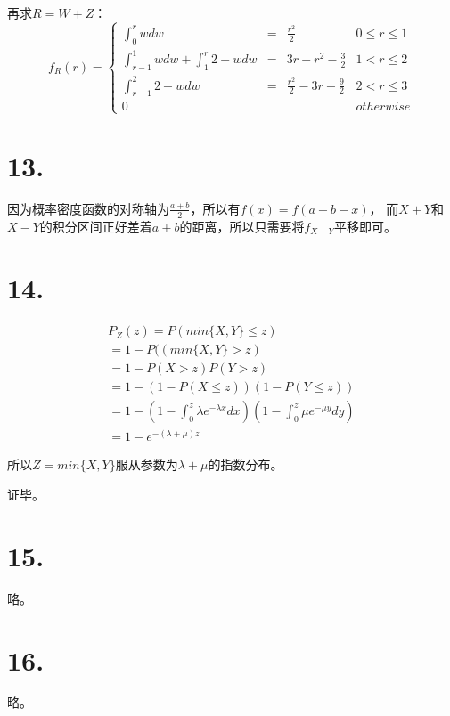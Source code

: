 \documentclass[UTF8]{report}
\begin{document}
        再求$R = W + Z$：
        $$f_R(r) = \left\{
            \begin{array}{llccr}
                \int_{0}^{r}wdw & = & \frac{r^2}{2} & 0 \leq r \leq 1\\
                \int_{r - 1}^{1}wdw + \int_{1}^{r}2-wdw & = & 3r - r^2 - \frac{3}{2} & 1 < r \leq 2\\
                \int_{r - 1}^{2}2 - wdw & = & \frac{r^2}{2} - 3r + \frac{9}{2} & 2 < r \leq 3\\
                0 & & & otherwise
            \end{array}
        \right.$$
    \section*{13.}
        因为概率密度函数的对称轴为$\frac{a + b}{2}$，所以有$f(x) = f(a + b - x)$，
        而$X + Y$和$X - Y$的积分区间正好差着$a + b$的距离，所以只需要将$f_{X + Y}$平移即可。
    \section*{14.}  
        $$\begin{array}{l}
            P_Z(z) = P(min\{X, Y\} \leq z)\\
            = 1 - P((min\{X, Y\} > z)\\
            = 1 - P(X > z)P(Y > z)\\
            = 1 - (1 - P(X \leq z))(1 - P(Y \leq z))\\
            = 1 - (1 - \int_{0}^{z}\lambda e^{-\lambda x}dx)(1 - \int_{0}^{z}\mu e^{-\mu y}dy)\\
            = 1 - e^{-(\lambda + \mu)z}
        \end{array}$$

        所以$Z = min\{X, Y\}$服从参数为$\lambda + \mu$的指数分布。

        证毕。
    \section*{15.}
        略。
    \section*{16.}
        略。
\end{document}

